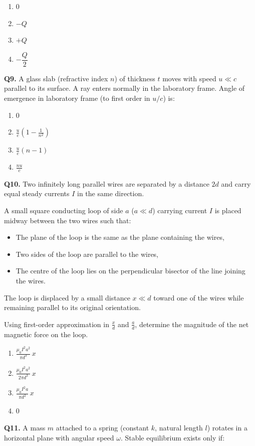 \documentclass[12pt]{article}
\begin{document}
\begin{enumerate}[label=(\Alph*)]
\item $0$
\item $-Q$
\item $+Q$
\item $-\dfrac{Q}{2}$
\end{enumerate}

\textbf{Q9.}  
A glass slab (refractive index $n$) of thickness $t$ moves with speed $u \ll c$ parallel to its surface.  
A ray enters normally in the laboratory frame.  
Angle of emergence in laboratory frame (to first order in $u/c$) is:

\begin{enumerate}[label=(\Alph*)]
\item $0$
\item $\displaystyle \frac{u}{c}\!\left(1-\frac{1}{n^2}\right)$
\item $\displaystyle \frac{u}{c}(n-1)$
\item $\displaystyle \frac{nu}{c}$
\end{enumerate}

\textbf{Q10.}  
Two infinitely long parallel wires are separated by a distance $2d$ and carry equal steady currents $I$ in the same direction.  

A small square conducting loop of side $a$ ($a \ll d$) carrying current $I$ is placed midway between the two wires such that:

\begin{itemize}
\item The plane of the loop is the same as the plane containing the wires,
\item Two sides of the loop are parallel to the wires,
\item The centre of the loop lies on the perpendicular bisector of the line joining the wires.
\end{itemize}

The loop is displaced by a small distance $x \ll d$ toward one of the wires while remaining parallel to its original orientation.

Using first-order approximation in $\frac{x}{d}$ and $\frac{a}{d}$, determine the magnitude of the net magnetic force on the loop.

\begin{enumerate}[label=(\Alph*)]
\item $\displaystyle \frac{\mu_0 I^2 a^2}{\pi d^3}\, x$

\item $\displaystyle \frac{\mu_0 I^2 a^2}{2\pi d^3}\, x$

\item $\displaystyle \frac{\mu_0 I^2 a}{\pi d^2}\, x$

\item $0$
\end{enumerate}
\textbf{Q11.}  
A mass $m$ attached to a spring (constant $k$, natural length $l$) rotates in a horizontal plane with angular speed $\omega$.  
Stable equilibrium exists only if:
\end{document}
